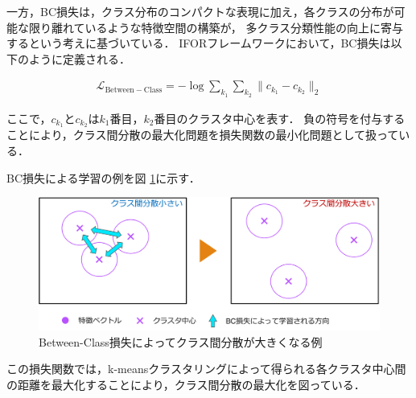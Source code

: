 \documentclass[a4paper,11pt,nomag]{jsreport}
\begin{document}
一方，BC損失は，クラス分布のコンパクトな表現に加え，各クラスの分布が可能な限り離れているような特徴空間の構築が，
多クラス分類性能の向上に寄与するという考えに基づいている．
IFORフレームワークにおいて，BC損失は以下のように定義される．

\begin{align}
  \mathcal{L}_{\mathrm{Between-Class}} = -\log{\sum_{k_1} {\sum_{k_2} {\lVert c_{k_1} - c_{k_2} \rVert_2}}}
\end{align}

\noindent
ここで，$c_{k_1}$と$c_{k_2}$は$k_1$番目，$k_2$番目のクラスタ中心を表す．
負の符号を付与することにより，クラス間分散の最大化問題を損失関数の最小化問題として扱っている．

BC損失による学習の例を図 \ref{fig:bc_loss}に示す．
% 
\begin{figure}[tbp]
  \centering
  \includegraphics[width=\linewidth, keepaspectratio]{image/bc_loss.png}
  \caption{Between-Class損失によってクラス間分散が大きくなる例}
  \label{fig:bc_loss}
\end{figure}
%
この損失関数では，k-meansクラスタリングによって得られる各クラスタ中心間の距離を最大化することにより，クラス間分散の最大化を図っている．



\end{document}
